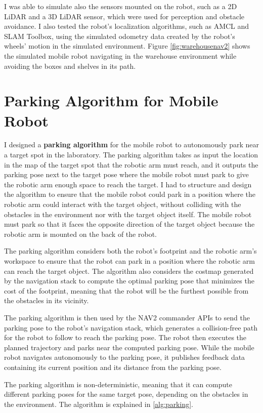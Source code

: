 I was able to simulate also the sensors mounted on the robot, such as a 2D LiDAR and a 3D LiDAR sensor, which were used
for perception and obstacle avoidance. I also tested the robot's localization algorithms, such as AMCL and SLAM Toolbox,
using the simulated odometry data created by the robot's wheels' motion in the simulated environment. Figure 
\ref{fig:warehousenav2} shows the simulated mobile robot navigating in the warehouse environment
while avoiding the boxes and shelves in its path.


\section{Parking Algorithm for Mobile Robot}

I designed a \textbf{parking algorithm} for the mobile robot to autonomously park near a target spot in the laboratory.
The parking algorithm takes as input the location in the map of the target spot that the robotic arm must reach,
and it outputs the parking pose next to the target pose where the mobile robot must park to give the robotic arm
enough space to reach the target. I had to structure and design the algorithm to ensure that the mobile robot
could park in a position where the robotic arm could interact with the target object, without colliding with 
the obstacles in the environment nor with the target object itself. The mobile robot must park so that it 
faces the opposite direction of the target object because the robotic arm is mounted on the back of the robot.

The parking algorithm considers both the robot's footprint and the robotic arm's workspace to ensure that the
robot can park in a position where the robotic arm can reach the target object. 
The algorithm also considers the costmap generated by the navigation stack to compute the optimal parking
pose that minimizes the cost of the footprint, meaning that the robot will be the furthest possible from
the obstacles in its vicinity. 

The parking algorithm is then used by the NAV2 commander APIs to send the parking pose to the robot's navigation stack,
which generates a collision-free path for the robot to follow to reach the parking pose. The robot then executes
the planned trajectory and parks near the computed parking pose. While the mobile robot navigates
autonomously to the parking pose, it publishes feedback data containing its current position and its distance 
from the parking pose. 

The parking algorithm is non-deterministic, meaning that it can compute different parking poses for the same target
pose, depending on the obstacles in the environment. The algorithm is explained in \ref{alg:parking}.

